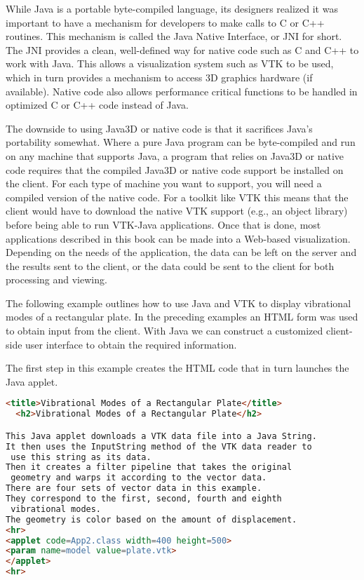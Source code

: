 While Java is a portable byte-compiled language, its designers realized it was important to have a mechanism for developers to make calls to C or C++ routines. This mechanism is called the Java Native Interface, or JNI for short. The JNI provides a clean, well-defined way for native code such as C and C++ to work with Java. This allows a visualization system such as VTK to be used, which in turn provides a mechanism to access 3D graphics hardware (if available). Native code also allows performance critical functions to be handled in optimized C or C++ code instead of Java.

The downside to using Java3D or native code is that it sacrifices Java's portability somewhat. Where a pure Java program can be byte-compiled and run on any machine that supports Java, a program that relies on Java3D or native code requires that the compiled Java3D or native code support be installed on the client. For each type of machine you want to support, you will need a compiled version of the native code. For a toolkit like VTK this means that the client would have to download the native VTK support (e.g., an object library) before being able to run VTK-Java applications. Once that is done, most applications described in this book can be made into a Web-based visualization. Depending on the needs of the application, the data can be left on the server and the results sent to the client, or the data could be sent to the client for both processing and viewing.

The following example outlines how to use Java and VTK to display vibrational modes of a rectangular plate. In the preceding examples an HTML form was used to obtain input from the client. With Java we can construct a customized client-side user interface to obtain the required information.

The first step in this example creates the HTML code that in turn launches the Java applet.

\begin{lstlisting}[language=HTML, caption={}, numbers=none, frame=none]
<title>Vibrational Modes of a Rectangular Plate</title>
  <h2>Vibrational Modes of a Rectangular Plate</h2>

This Java applet downloads a VTK data file into a Java String.
It then uses the InputString method of the VTK data reader to
 use this string as its data.
Then it creates a filter pipeline that takes the original
 geometry and warps it according to the vector data.
There are four sets of vector data in this example.
They correspond to the first, second, fourth and eighth
 vibrational modes.
The geometry is color based on the amount of displacement.
<hr>
<applet code=App2.class width=400 height=500>
<param name=model value=plate.vtk>
</applet>
<hr>
\end{lstlisting}

